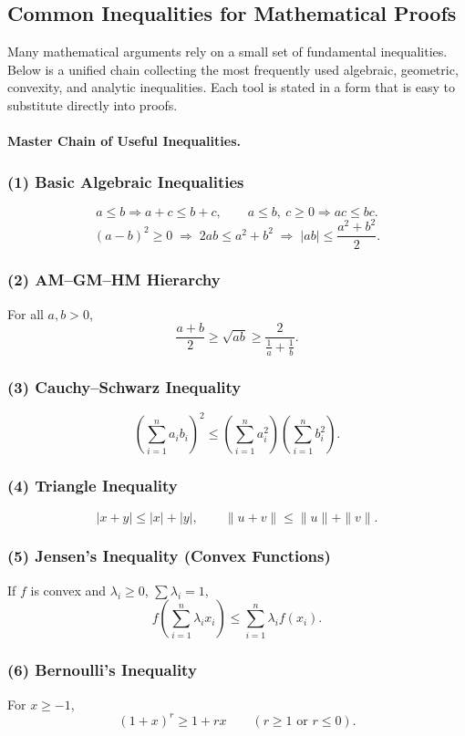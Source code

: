\documentclass[10pt]{article}
\theoremstyle{definition}
\begin{document}
\subsection{Common Inequalities for Mathematical Proofs}
Many mathematical arguments rely on a small set of fundamental inequalities.
Below is a unified chain collecting the most frequently used algebraic,
geometric, convexity, and analytic inequalities.  Each tool is stated in a form
that is easy to substitute directly into proofs.
\paragraph{Master Chain of Useful Inequalities.}

\subsubsection*{(1) Basic Algebraic Inequalities}
\[
a \le b \Rightarrow a+c \le b+c,
\qquad
a \le b,\ c \ge 0 \Rightarrow ac \le bc.
\]
\[
(a-b)^2 \ge 0
\;\Rightarrow\;
2ab \le a^2 + b^2
\;\Rightarrow\;
|ab| \le \frac{a^2 + b^2}{2}.
\]

\subsubsection*{(2) AM--GM--HM Hierarchy}
For all \(a,b>0\),
\[
\frac{a+b}{2} \ge \sqrt{ab} \ge \frac{2}{\tfrac{1}{a}+\tfrac{1}{b}}.
\]

\subsubsection*{(3) Cauchy--Schwarz Inequality}
\[
\left(\sum_{i=1}^n a_i b_i\right)^2
\le
\left(\sum_{i=1}^n a_i^2\right)
\left(\sum_{i=1}^n b_i^2\right).
\]

\subsubsection*{(4) Triangle Inequality}
\[
|x+y|\le |x|+|y|,
\qquad
\|u+v\| \le \|u\| + \|v\|.
\]

\subsubsection*{(5) Jensen's Inequality (Convex Functions)}
If \(f\) is convex and \(\lambda_i \ge 0\), \(\sum \lambda_i = 1\),
\[
f\!\left(\sum_{i=1}^n \lambda_i x_i\right)
\le
\sum_{i=1}^n \lambda_i f(x_i).
\]

\subsubsection*{(6) Bernoulli's Inequality}
For \(x \ge -1\),
\[
(1+x)^r \ge 1 + rx
\qquad (r \ge 1 \text{ or } r \le 0).
\]
\end{document}
